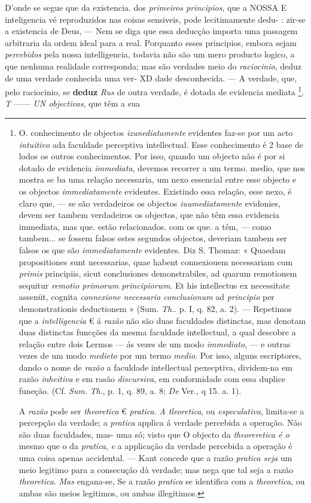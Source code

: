 D'onde se segue que da existencia. dos \emph{primeiros principios}, que a NOSSA E inteligencia vé reproduzidos nas coisas sensiveis, pode lecitimamente dedu- : zir-se a existencia de Deus, --- Nem se diga que essa deducção importa uma passagem arbitraria da ordem ideal para a real. Porquanto esses principios, embora sejam \emph{percebidos} pela nossa intelligencia, todavia não são um mero producto logico, a que nenhuma realidade corresponda; mas são verdades   meio do \emph{raciocinio}, deduz de uma verdade conhecida uma ver- XD dade desconhecida. --- A verdade, que, pelo raciocinio, se \textbf{deduz} \emph{Rus} de outra verdade, é dotada de evidencia mediata \footnote{O. conhecimento de objectos \emph{izunediatamente} evidentes faz-se por um acto \emph{intuitivo} ada faculdade perceptiva intellectual. Esse conhecimento é 2 base de lodos os outros conhecimentos. Por isso, quando um objecto não é por si dotado de evidencia \emph{immediata}, devemos recorrer a um termo. medio, que nos mostra se ba uma relação necessaria, um nexo essencial entre esse objecto e os objectos \emph{immediatamente} evidentes. Existindo essa relação, esse nexo, é claro que, --- se são verdadeiros os objectos \emph{iuumediatamente} evidonies, devem ser tambem verdadeiros os objectos, que não têm essa evidencia immediata, mas que. estão relacionados. com os que. a têm, --- como tambem... se fossem falsos estes segundos objectos, deveriam tambem ser falsos os que são \emph{immediatamente} evidentes. Diz S. Thomaz: « Quaedam propositiones sunt necessarias, quae habent connexiouem necessariam cum \emph{primis} principiis, sicut conclusiones demonstrabiles, ad quarum remotionem sequitur \emph{remotio primorum principiorwm}. Et his intellectus ex necessitate assenüt, cognita \emph{connexione necessaria conclusionum} ad \emph{principio} per demonstrationis deductionem » (Sum. \emph{Th}.. p. I, q. 82, a. 2). --- Repetimos que a \emph{intelligencia} € á \emph{razão} não são duas faculdades distinctas, mas denotam duas distinctas funcções da mesma faculdade intellectual, a qual descobre a relação entre dois Lermos --- ás vezes de um modo \emph{immediato}, --- e outras vezes de um modo \emph{medieto} por um termo \emph{medio}. Por isso, alguns escriptores, dando o nome de \emph{razão} a faculdade intellectual pexecptiva, dividem-na em razão \emph{inheitiva} e em rasão \emph{discursiva}, em conformidade com essa duplice funeção. (Cf. \emph{Sum}. \emph{Th}., p. 1, q. 89, a. 8; \emph{De} Ver., q 15. a. 1).\par A \emph{razão} pode ser \emph{theoretica} € \emph{pratica}. \emph{A tleoretica}, ou \emph{especulativa}, limita-se a percepção da verdade; a \emph{pratica} applica á verdade percebida a operação. Não são duas faculdades, mas- uma só; visto que O objecto da \emph{theoreretica é o} mesmo que o da \emph{pratica}, \emph{e} a applicação da verdade percebida a operação é uma coisa apenas accidental. --- Kant concede que a razão \emph{pratica seja} um meio legitimo para a consecução dà verdade; mas nega que tal seja a razão \emph{theoretica}. \emph{Mas} engana-se, Se a razão \emph{pratica} se identifica com a \emph{theoretica}, ou ambas são meios legitimos, ou ambas illegitimos.}. \emph{T} ------ \emph{UN objectivas}, que têm a sua 